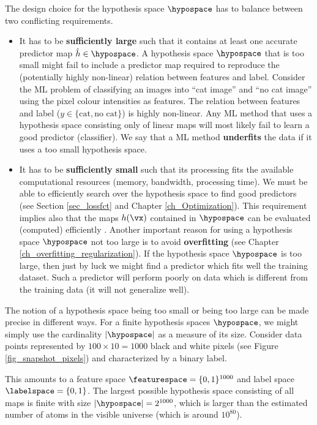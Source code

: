 \documentclass[12pt]{report}
\begin{document}
The design choice for the hypothesis space $\hypospace$ has to balance between two conflicting requirements.  
\begin{itemize} 
\item It has to be {\bf sufficiently large} such that it contains at least 
one accurate predictor map $\hat{h} \in \hypospace$. A hypothesis space $\hypospace$ 
that is too small might fail to include a predictor map required to reproduce the (potentially 
highly non-linear) relation between features and label. Consider the ML problem of classifying 
an images into ``cat image'' and ``no cat image'' using the pixel colour intensities as features. 
The relation between features and label ($y \in \{ \mbox{cat}, \mbox{no cat} \}$) is highly non-linear. 
Any ML method that uses a hypothesis space consisting only of linear maps will most likely 
fail to learn a good predictor (classifier). We say that a ML method {\bf underfits} the data if it 
uses a too small hypothesis space. 
\item It has to be {\bf sufficiently small} such that its processing fits the available computational 
resources (memory, bandwidth, processing time). We must be able to efficiently search over the 
hypothesis space to find good predictors (see Section \ref{sec_lossfct} and Chapter \ref{ch_Optimization}). 
This requirement implies also that the maps $h(\vx)$ contained in $\hypospace$ can be evaluated 
(computed) efficiently \cite{Austin2018}. Another important reason for using a hypothesis space $\hypospace$ 
not too large is to avoid {\bf overfitting} (see Chapter \ref{ch_overfitting_regularization}). 
If the hypothesis space $\hypospace$ is too large, then just by luck we might find a predictor which fits 
well the training dataset. Such a predictor will perform poorly on data which is different from 
the training data (it will not generalize well). 
\end{itemize}

The notion of a hypothesis space being too small or being too large can 
be made precise in different ways. For a finite hypothesis spaces $\hypospace$, 
we might simply use the cardinality $|\hypospace|$ as a measure of its size. 
Consider data points represented by $100 \times 10 = 1000$ black and white 
pixels (see Figure \ref{fig_snapshot_pixels}) and characterized by a binary label. 

This amounts to a feature space $\featurespace = \{0,1\}^{1000}$ and label space 
$\labelspace = \{0,1\}$. The largest possible hypothesis space consisting of 
all maps is finite with size $|\hypospace| = 2^{1000}$, which is larger than 
the estimated number of atoms in the visible universe (which is around $10^{80}$). 
\end{document}
